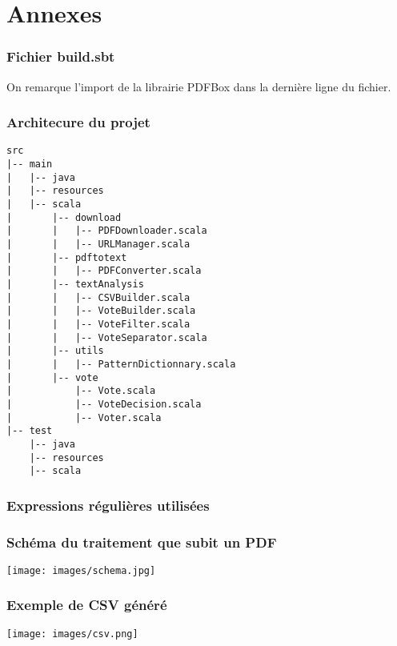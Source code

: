 \appendix

\part*{Annexes}

\section*{Fichier build.sbt}\label{sbt}


\vspace{1cm}
On remarque l'import de la librairie PDFBox dans la dernière ligne du fichier.

\newpage

\section*{Architecure du projet}\label{archi}

\begin{verbatim}
src
|-- main
|   |-- java
|   |-- resources
|   |-- scala
|       |-- download
|       |   |-- PDFDownloader.scala
|       |   |-- URLManager.scala
|       |-- pdftotext
|       |   |-- PDFConverter.scala
|       |-- textAnalysis
|       |   |-- CSVBuilder.scala
|       |   |-- VoteBuilder.scala
|       |   |-- VoteFilter.scala
|       |   |-- VoteSeparator.scala
|       |-- utils
|       |   |-- PatternDictionnary.scala
|       |-- vote
|           |-- Vote.scala
|           |-- VoteDecision.scala
|           |-- Voter.scala
|-- test
    |-- java
    |-- resources
    |-- scala
\end{verbatim}

\newpage

\section*{Expressions régulières utilisées}\label{expr}
\newpage

\section*{Schéma du traitement que subit un PDF}\label{schema}

\begin{center}
\texttt{[image: images/schema.jpg]}
\end{center}

\newpage

\thispagestyle{empty}
\section*{Exemple de CSV généré}\label{CSV}

\begin{center}
\texttt{[image: images/csv.png]}
\end{center}
